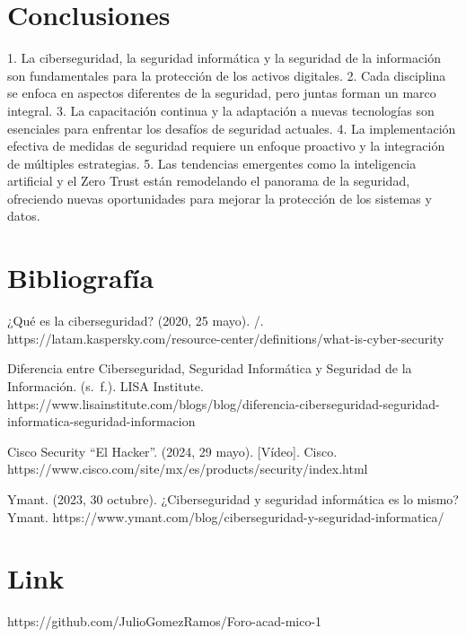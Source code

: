 \documentclass[12pt]{article}
\begin{document}
\section*{Conclusiones}
1. La ciberseguridad, la seguridad informática y la seguridad de la información son fundamentales para la protección de los activos digitales.
2. Cada disciplina se enfoca en aspectos diferentes de la seguridad, pero juntas forman un marco integral.
3. La capacitación continua y la adaptación a nuevas tecnologías son esenciales para enfrentar los desafíos de seguridad actuales.
4. La implementación efectiva de medidas de seguridad requiere un enfoque proactivo y la integración de múltiples estrategias.
5. Las tendencias emergentes como la inteligencia artificial y el Zero Trust están remodelando el panorama de la seguridad, ofreciendo nuevas oportunidades para mejorar la protección de los sistemas y datos.

\section*{Bibliografía}
¿Qué es la ciberseguridad? (2020, 25 mayo). /. https://latam.kaspersky.com/resource-center/definitions/what-is-cyber-security

Diferencia entre Ciberseguridad, Seguridad Informática y Seguridad de la Información. (s. f.). LISA Institute. https://www.lisainstitute.com/blogs/blog/diferencia-ciberseguridad-seguridad-informatica-seguridad-informacion

Cisco Security “El Hacker”. (2024, 29 mayo). [Vídeo]. Cisco. https://www.cisco.com/site/mx/es/products/security/index.html

Ymant. (2023, 30 octubre). ¿Ciberseguridad y seguridad informática es lo mismo? Ymant. https://www.ymant.com/blog/ciberseguridad-y-seguridad-informatica/

\section*{Link} 
https://github.com/JulioGomezRamos/Foro-acad-mico-1
\end{document}
